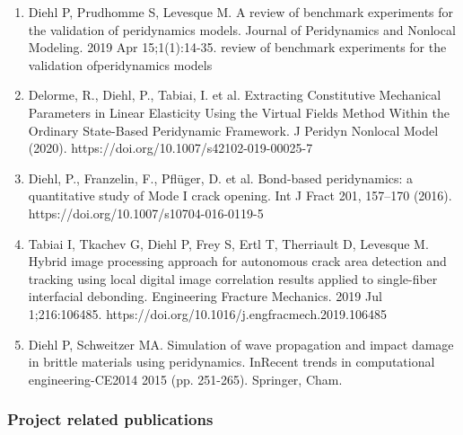 \documentclass[svgnames,11pt]{article}
\begin{document}
\begin{enumerate}
    \item Diehl P, Prudhomme S, Levesque M. A review of benchmark experiments for the validation of peridynamics models. Journal of Peridynamics and Nonlocal Modeling. 2019 Apr 15;1(1):14-35.   review  of  benchmark  experiments  for  the  validation  ofperidynamics models
    \item Delorme, R., Diehl, P., Tabiai, I. et al. Extracting Constitutive Mechanical Parameters in Linear Elasticity Using the Virtual Fields Method Within the Ordinary State-Based Peridynamic Framework. J Peridyn Nonlocal Model (2020). https://doi.org/10.1007/s42102-019-00025-7
    \item Diehl, P., Franzelin, F., Pfl\"uger, D. et al. Bond-based peridynamics: a quantitative study of Mode I crack opening. Int J Fract 201, 157--170 (2016). https://doi.org/10.1007/s10704-016-0119-5
    \item Tabiai I, Tkachev G, Diehl P, Frey S, Ertl T, Therriault D, Levesque M. Hybrid image processing approach for autonomous crack area detection and tracking using local digital image correlation results applied to single-fiber interfacial debonding. Engineering Fracture Mechanics. 2019 Jul 1;216:106485. https://doi.org/10.1016/j.engfracmech.2019.106485
    \item Diehl P, Schweitzer MA. Simulation of wave propagation and impact damage in brittle materials using peridynamics. InRecent trends in computational engineering-CE2014 2015 (pp. 251-265). Springer, Cham.
\end{enumerate}

\subsubsection{Project related publications}
\end{document}
